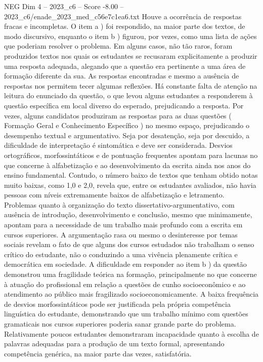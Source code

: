 \begin{textsample}{NEG Dim 4 – 2023\_c6 – Score -8.00 – 2023\_c6/enade\_2023\_med\_c56e7c1ea6.txt}
Houve a ocorrência de respostas fracas e incompletas.
O item a ) foi respondido, na maior parte dos textos, de modo discursivo, enquanto o item b ) figurou, por vezes, como uma lista de ações que poderiam resolver o problema.
Em alguns casos, não tão raros, foram produzidos textos nos quais os estudantes se recusaram explicitamente a produzir uma resposta adequada, alegando que a questão era pertinente a uma área de formação diferente da sua.
As respostas encontradas e mesmo a ausência de respostas nos permitem tecer algumas reflexões.
Há constante falta de atenção na leitura do enunciado da questão, o que levou alguns estudantes a responderem à questão específica em local diverso do esperado, prejudicando a resposta.
Por vezes, alguns candidatos produziram as respostas para as duas questões ( Formação Geral e Conhecimento Específico ) no mesmo espaço, prejudicando o desempenho textual e argumentativo.
Seja por desatenção, seja por descuido, a dificuldade de interpretação é sintomática e deve ser considerada.
Desvios ortográficos, morfossintáticos e de pontuação frequentes apontam para lacunas no que concerne à alfabetização e ao desenvolvimento da escrita ainda nos anos do ensino fundamental.
Contudo, o número baixo de textos que tenham obtido notas muito baixas, como 1,0 e 2,0, revela que, entre os estudantes avaliados, não havia pessoas com níveis extremamente baixos de alfabetização e letramento.
Problemas quanto à organização do texto dissertativo-argumentativo, com ausência de introdução, desenvolvimento e conclusão, mesmo que minimamente, apontam para a necessidade de um trabalho mais profundo com a escrita em cursos superiores.
A argumentação rasa ou mesmo o desinteresse por temas sociais revelam o fato de que alguns dos cursos estudados não trabalham o senso crítico do estudante, não o conduzindo a uma vivência plenamente crítica e democrática em sociedade.
A dificuldade em responder ao item b ) da questão demonstrou uma fragilidade teórica na formação, principalmente no que concerne à atuação do profissional em relação a questões de cunho socioeconômico e ao atendimento ao público mais fragilizado socioeconomicamente.
A baixa frequência de desvios morfossintáticos pode ser justificada pela própria competência linguística do estudante, demonstrando que um trabalho mínimo com questões gramaticais nos cursos superiores poderia sanar grande parte do problema.
Relativamente poucos estudantes demonstraram incapacidade quanto à escolha de palavras adequadas para a produção de um texto formal, apresentando competência genérica, na maior parte das vezes, satisfatória.

\end{textsample}
